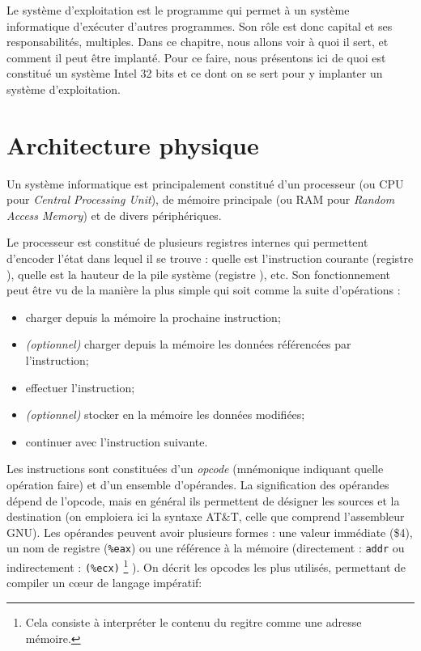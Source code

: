 Le système d'exploitation est le programme qui permet à un système informatique
d'exécuter d'autres programmes. Son rôle est donc capital et ses
responsabilités, multiples. Dans ce chapitre, nous allons voir à quoi il sert,
et comment il peut être implanté. Pour ce faire, nous présentons ici de quoi est
constitué un système Intel 32 bits et ce dont on se sert pour y implanter un
système d'exploitation.

\section{Architecture physique}

Un système informatique est principalement constitué d'un processeur (ou CPU
pour \emph{Central Processing Unit}), de mémoire principale (ou RAM pour
\emph{Random Access Memory}) et de divers périphériques.

Le processeur est constitué de plusieurs registres internes qui permettent
d'encoder l'état dans lequel il se trouve : quelle est l'instruction courante
(registre \eip), quelle est la hauteur de la pile système (registre \esp), etc.
Son fonctionnement peut être vu de la manière la plus simple qui soit comme la
suite d'opérations :

\begin{itemize}
\item
  charger depuis la mémoire la prochaine instruction;
\item
  \emph{(optionnel)} charger depuis la mémoire les données référencées
  par l'instruction;
\item
  effectuer l'instruction;
\item
  \emph{(optionnel)} stocker en la mémoire les données modifiées;
\item
  continuer avec l'instruction suivante.
\end{itemize}

Les instructions sont constituées d'un \emph{opcode} (mnémonique indiquant
quelle opération faire) et d'un ensemble d'opérandes. La signification des
opérandes dépend de l'opcode, mais en général ils permettent de désigner les
sources et la destination (on emploiera ici la syntaxe AT\&T, celle que comprend
l'assembleur GNU). Les opérandes peuvent avoir plusieurs formes : une valeur
immédiate (\$4), un nom de registre (\texttt{\%eax}) ou une référence à la
mémoire (directement : \texttt{addr} ou indirectement : \texttt{(\%ecx)}
\footnote{
  Cela consiste à interpréter le contenu du regitre \ecx comme une adresse
  mémoire.
}
). On décrit les opcodes les plus utilisés, permettant de compiler un cœur
de langage impératif:

